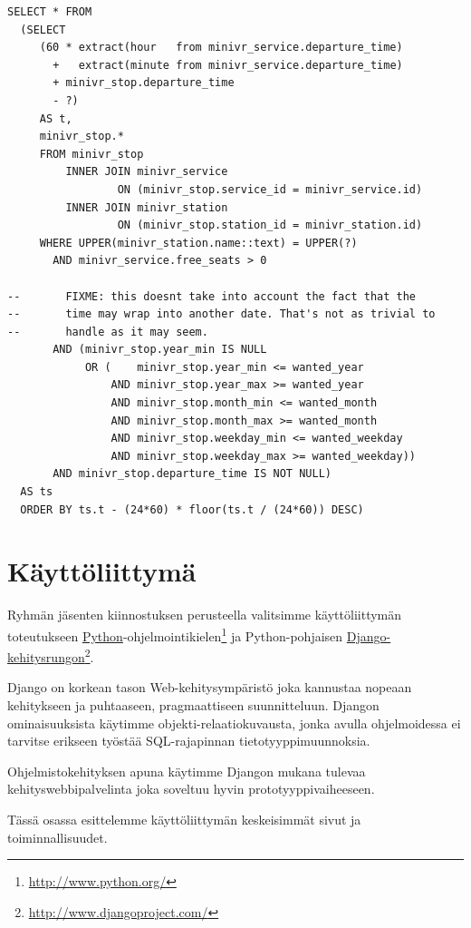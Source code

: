 \documentclass[a4paper,twoside,titlepage,12pt]{article}
\begin{document}
\begin{lstlisting}
SELECT * FROM
  (SELECT
     (60 * extract(hour   from minivr_service.departure_time)
       +   extract(minute from minivr_service.departure_time)
       + minivr_stop.departure_time
       - ?)
     AS t,
     minivr_stop.*
     FROM minivr_stop
         INNER JOIN minivr_service
                 ON (minivr_stop.service_id = minivr_service.id)
         INNER JOIN minivr_station
                 ON (minivr_stop.station_id = minivr_station.id)
     WHERE UPPER(minivr_station.name::text) = UPPER(?)
       AND minivr_service.free_seats > 0

--       FIXME: this doesnt take into account the fact that the
--       time may wrap into another date. That's not as trivial to
--       handle as it may seem.
       AND (minivr_stop.year_min IS NULL
            OR (    minivr_stop.year_min <= wanted_year
                AND minivr_stop.year_max >= wanted_year
                AND minivr_stop.month_min <= wanted_month
                AND minivr_stop.month_max >= wanted_month
                AND minivr_stop.weekday_min <= wanted_weekday
                AND minivr_stop.weekday_max >= wanted_weekday))
       AND minivr_stop.departure_time IS NOT NULL)
  AS ts
  ORDER BY ts.t - (24*60) * floor(ts.t / (24*60)) DESC)
\end{lstlisting}

\section{Käyttöliittymä}

Ryhmän jäsenten kiinnostuksen perusteella valitsimme käyttöliittymän toteutukseen \href{http://www.python.org/}{Python}-ohjelmointikielen\footnote{\url{http://www.python.org/}} ja Python-pohjaisen \href{http://www.djangoproject.com/}{Django-kehitysrungon}\footnote{\url{http://www.djangoproject.com/}}.

Django on korkean tason Web-kehitysympäristö joka kannustaa nopeaan kehitykseen ja puhtaaseen, pragmaattiseen suunnitteluun. Djangon ominaisuuksista käytimme objekti-relaatiokuvausta, jonka avulla ohjelmoidessa ei tarvitse erikseen työstää SQL-rajapinnan tietotyyppimuunnoksia.

Ohjelmistokehityksen apuna käytimme Djangon mukana tulevaa kehityswebbipalvelinta joka soveltuu hyvin prototyyppivaiheeseen.

Tässä osassa esittelemme käyttöliittymän keskeisimmät sivut ja toiminnallisuudet.
\end{document}
